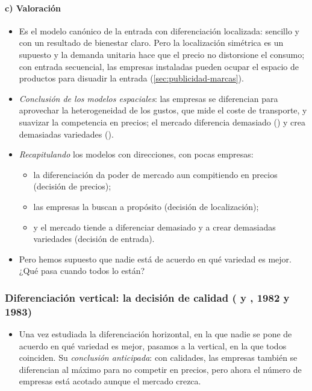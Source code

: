\documentclass[11pt]{article}
\begin{document}
\paragraph{c) Valoración}

\begin{itemize}
\item Es el modelo canónico de la entrada con diferenciación localizada: sencillo y con un resultado de bienestar claro. Pero la localización simétrica es un supuesto y la demanda unitaria hace que el precio no distorsione el consumo; con entrada secuencial, las empresas instaladas pueden ocupar el espacio de productos para disuadir la entrada (\ref{sec:publicidad-marcas}).
\item \emph{Conclusión de los modelos espaciales}: las empresas se diferencian para aprovechar la heterogeneidad de los gustos, que mide el coste de transporte, y suavizar la competencia en precios; el mercado diferencia demasiado () y crea demasiadas variedades ().
\end{itemize}

\begin{itemize}
\item \emph{Recapitulando} los modelos con direcciones, con pocas empresas:
  \begin{itemize}
  \item la diferenciación da poder de mercado aun compitiendo en precios (decisión de precios);
  \item las empresas la buscan a propósito (decisión de localización);
  \item y el mercado tiende a diferenciar demasiado y a crear demasiadas variedades (decisión de entrada).
  \end{itemize}
\item Pero hemos supuesto que nadie está de acuerdo en qué variedad es mejor. ¿Qué pasa cuando todos lo están?
\end{itemize}

\subsubsection{Diferenciación vertical: la decisión de calidad ( y , 1982 y 1983)}\label{sec:shaked-sutton}

\begin{itemize}
\item Una vez estudiada la diferenciación horizontal, en la que nadie se pone de acuerdo en qué variedad es mejor, pasamos a la vertical, en la que todos coinciden. Su \emph{conclusión anticipada}: con calidades, las empresas también se diferencian al máximo para no competir en precios, pero ahora el número de empresas está acotado aunque el mercado crezca.
\end{itemize}
\end{document}
